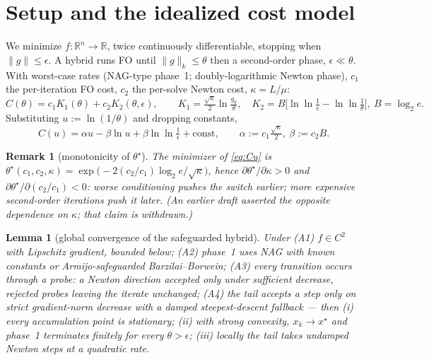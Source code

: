 ﻿\documentclass[10pt]{article}
\newtheorem{lemma}{Lemma}
\newtheorem{remark}{Remark}
\newcommand{\gnorm}{\lVert g\rVert}
\newcommand{\R}{\mathbb{R}}
\begin{document}
\section{Setup and the idealized cost model}\label{sec:model}

We minimize $f:\R^n\to\R$, twice continuously differentiable, stopping
when $\gnorm\le\epsilon$. A hybrid runs FO until $\gnorm_k\le\theta$
then a second-order phase, $\epsilon\ll\theta$. With worst-case rates
(NAG-type phase~1; doubly-logarithmic Newton phase),
$c_1$ the per-iteration FO cost, $c_2$ the per-solve Newton cost,
$\kappa=L/\mu$:
\begin{equation}
C(\theta)=c_1K_1(\theta)+c_2K_2(\theta,\epsilon),\qquad
K_1=\tfrac{\sqrt\kappa}{2}\ln\tfrac{g_0}{\theta},\quad
K_2=B\bigl[\ln\ln\tfrac1\epsilon-\ln\ln\tfrac1\theta\bigr],
\ B=\log_2 e .
\end{equation}
Substituting $u:=\ln(1/\theta)$ and dropping constants,
\begin{equation}\label{eq:Cu}
C(u)=\alpha u-\beta\ln u+\beta\ln\ln\tfrac1\epsilon+\text{const},
\qquad \alpha:=c_1\tfrac{\sqrt\kappa}{2},\ \beta:=c_2B .
\end{equation}

\begin{remark}[monotonicity of $\theta^\star$]\label{rem:mono}
The minimizer of \eqref{eq:Cu} is
$\theta^\star(c_1,c_2,\kappa)
=\exp\!\bigl(-2(c_2/c_1)\log_2 e/\sqrt\kappa\bigr)$, hence
$\partial\theta^\star/\partial\kappa>0$ and
$\partial\theta^\star/\partial(c_2/c_1)<0$: worse conditioning pushes
the switch \emph{earlier}; more expensive second-order iterations push
it \emph{later}. (An earlier draft asserted the opposite dependence on
$\kappa$; that claim is withdrawn.)
\end{remark}

\begin{lemma}[global convergence of the safeguarded hybrid]
\label{lem:glob}
Under (A1) $f\in C^2$ with Lipschitz gradient, bounded below;
(A2) phase~1 uses NAG with known constants or Armijo-safeguarded
Barzilai--Borwein; (A3) every transition occurs through a \emph{probe}:
a Newton direction accepted only under sufficient decrease, rejected
probes leaving the iterate unchanged; (A4) the tail accepts a step only
on strict gradient-norm decrease with a damped steepest-descent
fallback --- then (i) every accumulation point is stationary; (ii) with
strong convexity, $x_k\to x^\star$ and phase~1 terminates finitely for
every $\theta>\epsilon$; (iii) locally the tail takes undamped Newton
steps at a quadratic rate.
\end{lemma}
\end{document}
